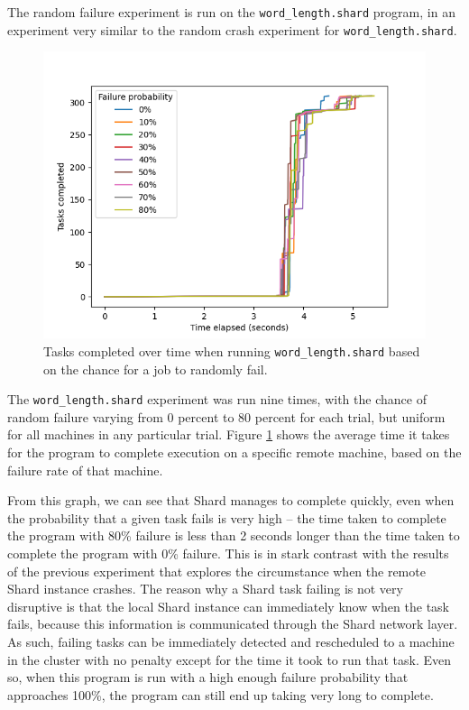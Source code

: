 \documentclass[oneside]{report}
\begin{document}
\begin{sloppypar}
  The random failure experiment is run on the \texttt{word\_length.shard} program, in an experiment very similar to the random crash experiment for \texttt{word\_length.shard}.
\end{sloppypar}

\begin{figure}[h]
  \begin{center}
    \includegraphics[scale=0.9]{img/experiments/e8_1620960581241.png}
    \caption{Tasks completed over time when running \texttt{word\_length.shard} based on the chance for a job to randomly fail.}
    \label{fig:failwordlength}
  \end{center}
\end{figure}

The \texttt{word\_length.shard} experiment was run nine times, with the chance of random failure varying from 0 percent to 80 percent for each trial, but uniform for all machines in any particular trial.
Figure \ref{fig:failwordlength} shows the average time it takes for the program to complete execution on a specific remote machine, based on the failure rate of that machine.

From this graph, we can see that Shard manages to complete quickly, even when the probability that a given task fails is very high -- the time taken to complete the program with 80\% failure is less than 2 seconds longer than the time taken to complete the program with 0\% failure.
This is in stark contrast with the results of the previous experiment that explores the circumstance when the remote Shard instance crashes.
The reason why a Shard task failing is not very disruptive is that the local Shard instance can immediately know when the task fails, because this information is communicated through the Shard network layer.
As such, failing tasks can be immediately detected and rescheduled to a machine in the cluster with no penalty except for the time it took to run that task.
Even so, when this program is run with a high enough failure probability that approaches 100\%, the program can still end up taking very long to complete.
\end{document}

